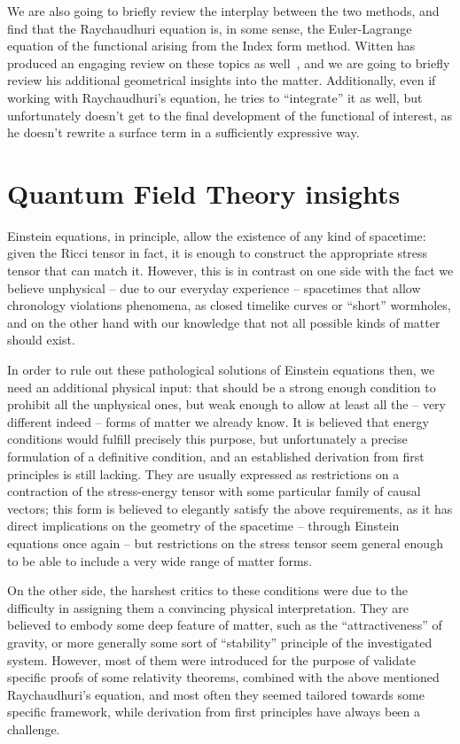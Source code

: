 We are also going to briefly review the interplay between the two methods, and find that the Raychaudhuri equation is, in some sense, the Euler-Lagrange equation of the functional arising from the Index form method. Witten has produced an engaging review on these topics as well~\cite[]{witten2020light}, and we are going to briefly review his additional geometrical insights into the matter. Additionally, even if working with Raychaudhuri's equation, he tries to ``integrate'' it as well, but unfortunately doesn't get to the final development of the functional of interest, as he doesn't rewrite a surface term in a sufficiently expressive way.

\section{Quantum Field Theory insights}
Einstein equations, in principle, allow the existence of any kind of spacetime: given the Ricci tensor in fact, it is enough to construct the appropriate stress tensor that can match it. However, this is in contrast on one side with the fact we believe unphysical -- due to our everyday experience -- spacetimes that allow chronology violations phenomena, as closed timelike curves or ``short'' wormholes, and on the other hand with our knowledge that not all possible kinds of matter should exist.

In order to rule out these pathological solutions of Einstein equations then, we need an additional physical input: that should be a strong enough condition to prohibit all the unphysical ones, but weak enough to allow at least all the -- very different indeed -- forms of matter we already know.
It is believed that energy conditions would fulfill precisely this purpose, but unfortunately a precise formulation of a definitive condition, and an established derivation from first principles is still lacking. They are usually expressed as restrictions on a contraction of the stress-energy tensor with some particular family of causal vectors; this form is believed to elegantly satisfy the above requirements, as it has direct implications on the geometry of the spacetime -- through Einstein equations once again -- but restrictions on the stress tensor seem general enough to be able to include a very wide range of matter forms.

On the other side, the harshest critics to these conditions were due to the difficulty in assigning them a convincing physical interpretation. They are believed to embody some deep feature of matter, such as the ``attractiveness'' of gravity, or more generally some sort of ``stability'' principle of the investigated system.
However, most of them were introduced for the purpose of validate specific proofs of some relativity theorems, combined with the above mentioned Raychaudhuri's equation, and most often they seemed tailored towards some specific framework, while derivation from first principles have always been a challenge.

